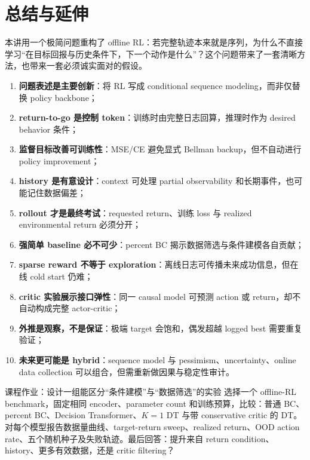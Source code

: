 \documentclass[a4paper]{article}
\begin{document}
\section{总结与延伸}

本讲用一个极简问题重构了 offline RL：若完整轨迹本来就是序列，为什么不直接学习“在目标回报与历史条件下，下一个动作是什么”？这个问题带来了一套清晰方法，也带来一套必须诚实面对的假设。

\begin{enumerate}
  \item \textbf{问题表述是主要创新}：将 RL 写成 conditional sequence modeling，而非仅替换 policy backbone；
  \item \textbf{return-to-go 是控制 token}：训练时由完整日志回算，推理时作为 desired behavior 条件；
  \item \textbf{监督目标改善可训练性}：MSE/CE 避免显式 Bellman backup，但不自动进行 policy improvement；
  \item \textbf{history 是有意设计}：context 可处理 partial observability 和长期事件，也可能记住数据偏差；
  \item \textbf{rollout 才是最终考试}：requested return、训练 loss 与 realized environmental return 必须分开；
  \item \textbf{强简单 baseline 必不可少}：percent BC 揭示数据筛选与条件建模各自贡献；
  \item \textbf{sparse reward 不等于 exploration}：离线日志可传播未来成功信息，但在线 cold start 仍难；
  \item \textbf{critic 实验展示接口弹性}：同一 causal model 可预测 action 或 return，却不自动构成完整 actor-critic；
  \item \textbf{外推是观察，不是保证}：极端 target 会饱和，偶发超越 logged best 需要重复验证；
  \item \textbf{未来更可能是 hybrid}：sequence model 与 pessimism、uncertainty、online data collection 可以组合，但需重新做因果与稳定性审计。
\end{enumerate}

\begin{importantbox}{课程作业：设计一组能区分“条件建模”与“数据筛选”的实验}
选择一个 offline-RL benchmark，固定相同 encoder、parameter count 和训练预算，比较：普通 BC、percent BC、Decision Transformer、$K=1$ DT 与带 conservative critic 的 DT。对每个模型报告数据量曲线、target-return sweep、realized return、OOD action rate、五个随机种子及失败轨迹。最后回答：提升来自 return condition、history、更多有效数据，还是 critic filtering？
\end{importantbox}
\end{document}
